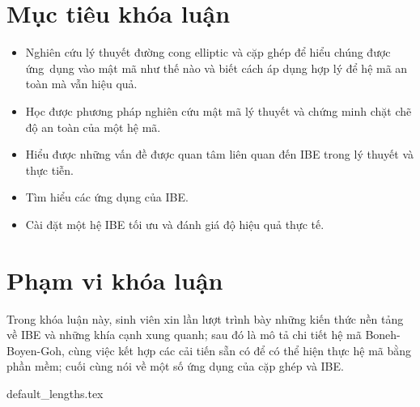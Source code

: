 \documentclass[class=report, crop=false]{standalone}
\begin{document}
	\section{Mục tiêu khóa luận}
		\begin{itemize}
			\item Nghiên cứu lý thuyết đường cong elliptic và cặp ghép để hiểu chúng được ứng~dụng vào mật mã như thế nào và biết cách áp dụng hợp lý để hệ mã an toàn mà vẫn hiệu quả.
			\item Học được phương pháp nghiên cứu mật mã lý thuyết và chứng minh chặt chẽ độ an toàn của một hệ mã.
			\item Hiểu được những vấn đề được quan tâm liên quan đến IBE trong lý thuyết và thực tiễn.
			\item Tìm hiểu các ứng dụng của IBE.
			\item Cài đặt một hệ IBE tối ưu và đánh giá độ hiệu quả thực tế.
		\end{itemize}
	\section{Phạm vi khóa luận}
		Trong khóa luận này, sinh viên xin lần lượt trình bày những kiến thức nền tảng về IBE và những khía cạnh xung quanh; sau đó là mô tả chi tiết hệ mã Boneh-Boyen-Goh, cùng việc kết hợp các cải tiến sẵn có để có thể hiện thực hệ mã bằng phần mềm; cuối cùng nói về một số ứng dụng của cặp ghép và IBE.

	\newpage
	{default_lengths.tex}
\end{document}
